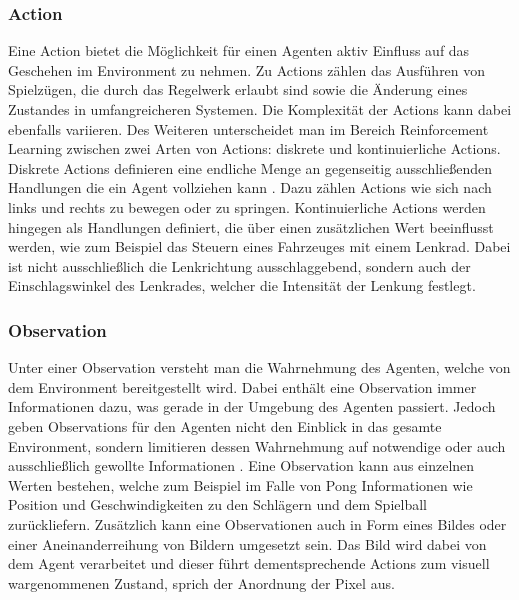 \documentclass[11pt]{scrartcl}
\begin{document}
\subsubsection{Action}
\label{sec:action}
Eine Action bietet die Möglichkeit für einen Agenten aktiv Einfluss auf das Geschehen im
Environment zu nehmen. Zu Actions zählen das Ausführen von Spielzügen, die durch das
Regelwerk erlaubt sind sowie die Änderung eines Zustandes in umfangreicheren Systemen. Die
Komplexität der Actions kann dabei ebenfalls variieren. Des Weiteren unterscheidet man im Bereich
Reinforcement Learning zwischen zwei Arten von Actions: diskrete und kontinuierliche Actions.
Diskrete Actions definieren eine endliche Menge an gegenseitig ausschließenden Handlungen die ein  %
Agent vollziehen kann \cite[~S.8]{L2018}. Dazu zählen Actions wie sich nach links und rechts zu
bewegen oder zu springen. Kontinuierliche Actions werden hingegen als Handlungen definiert, die
über einen zusätzlichen Wert beeinflusst werden, wie zum Beispiel das Steuern eines Fahrzeuges
mit einem Lenkrad. Dabei ist nicht ausschließlich die Lenkrichtung ausschlaggebend, sondern auch
der Einschlagswinkel des Lenkrades, welcher die Intensität der Lenkung festlegt.


\subsubsection{Observation}
Unter einer Observation versteht man die Wahrnehmung des Agenten, welche von dem Environment 
bereitgestellt wird. Dabei enthält eine Observation immer Informationen dazu, was gerade in der
Umgebung des Agenten passiert. Jedoch geben Observations für den Agenten nicht den Einblick  %
in das gesamte Environment, sondern limitieren dessen Wahrnehmung auf notwendige oder auch
ausschließlich gewollte Informationen \cite[~S.8 f.]{L2018}. Eine Observation kann aus einzelnen
Werten bestehen, welche zum Beispiel im Falle von Pong Informationen wie Position und
Geschwindigkeiten zu den Schlägern und dem Spielball zurückliefern. Zusätzlich kann eine
Observationen auch in Form eines Bildes oder einer Aneinanderreihung von Bildern umgesetzt sein.
Das Bild wird dabei von dem Agent verarbeitet und dieser führt dementsprechende Actions zum
visuell wargenommenen Zustand, sprich der Anordnung der Pixel aus. 
\end{document}
